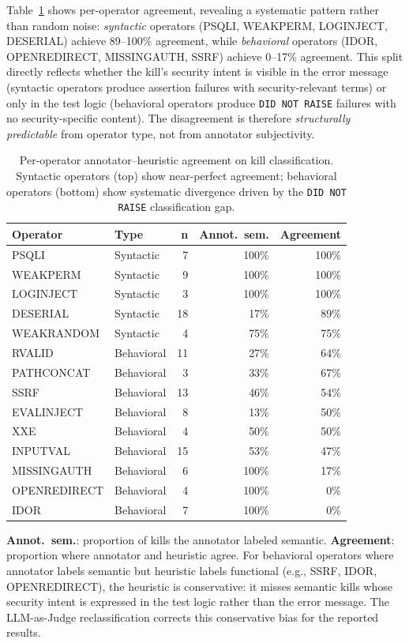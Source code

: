 \documentclass[sigconf,anonymous,review]{acmart}
\begin{document}
Table~\ref{tab:ira} shows per-operator agreement, revealing a
systematic pattern rather than random noise: \emph{syntactic}
operators (PSQLI, WEAKPERM, LOGINJECT, DESERIAL) achieve 89--100\%
agreement, while \emph{behavioral} operators (IDOR, OPENREDIRECT,
MISSINGAUTH, SSRF) achieve 0--17\% agreement. This split directly
reflects whether the kill's security intent is visible in the error
message (syntactic operators produce assertion failures with
security-relevant terms) or only in the test logic (behavioral
operators produce \texttt{DID NOT RAISE} failures with no security-specific
content). The disagreement is therefore \emph{structurally
predictable} from operator type, not from annotator subjectivity.

\begin{table}[t]
\caption{Per-operator annotator--heuristic agreement on kill
classification. Syntactic operators (top) show near-perfect
agreement; behavioral operators (bottom) show systematic divergence
driven by the \texttt{DID NOT RAISE} classification gap.}
\label{tab:ira}
\small
\setlength{\tabcolsep}{4pt}
\begin{tabular}{llrrr}
\toprule
\textbf{Operator} & \textbf{Type} &
\textbf{n} &
\textbf{Annot.\ sem.} &
\textbf{Agreement} \\
\midrule
PSQLI        & Syntactic &  7 & 100\% & 100\% \\
WEAKPERM     & Syntactic &  9 & 100\% & 100\% \\
LOGINJECT    & Syntactic &  3 & 100\% & 100\% \\
DESERIAL     & Syntactic & 18 &  17\% &  89\% \\
WEAKRANDOM   & Syntactic &  4 &  75\% &  75\% \\
\midrule
RVALID       & Behavioral & 11 &  27\% &  64\% \\
PATHCONCAT   & Behavioral &  3 &  33\% &  67\% \\
SSRF         & Behavioral & 13 &  46\% &  54\% \\
EVALINJECT   & Behavioral &  8 &  13\% &  50\% \\
XXE          & Behavioral &  4 &  50\% &  50\% \\
INPUTVAL     & Behavioral & 15 &  53\% &  47\% \\
MISSINGAUTH  & Behavioral &  6 & 100\% &  17\% \\
OPENREDIRECT & Behavioral &  4 & 100\% &   0\% \\
IDOR         & Behavioral &  7 & 100\% &   0\% \\
\bottomrule
\end{tabular}
\vspace{3pt}
{\footnotesize \textbf{Annot.\ sem.}: proportion of kills the
annotator labeled semantic. \textbf{Agreement}: proportion where
annotator and heuristic agree. For behavioral operators where
annotator labels semantic but heuristic labels functional (e.g.,
SSRF, IDOR, OPENREDIRECT), the heuristic is conservative: it misses
semantic kills whose security intent is expressed in the test logic
rather than the error message. The LLM-as-Judge reclassification
corrects this conservative bias for the reported results.}
\end{table}
\end{document}
